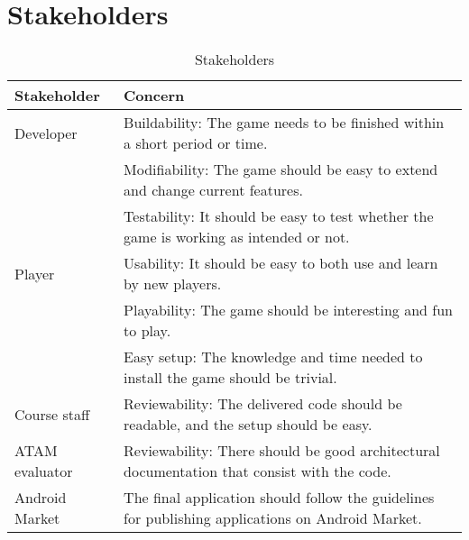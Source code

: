 \section{Stakeholders}

\begin{table}[h!]
\begin{tabular}{ | p{90pt} | p{270pt}  |}
\hline
\bf Stakeholder &  \bf Concern  \\ \hline
Developer & Buildability: The game needs to be finished within a short period or time. \\
&  Modifiability: The game should be easy to extend and change current features. \\
& Testability: It should be easy to test whether the game is working as intended or not.\\ \hline 
Player & Usability: It should be easy to both use and learn by new players. \\
& Playability: The game should be interesting and fun to play. \\
& Easy setup: The knowledge and time needed to install the game should be trivial. \\ \hline
Course staff & Reviewability: The delivered code should be readable, and the setup should be easy. \\ \hline
ATAM evaluator & Reviewability: There should be good architectural documentation that consist with the code.  \\ \hline
Android Market & The final application should follow the guidelines for publishing applications on Android Market. \\ \hline
\end{tabular}

\caption{Stakeholders}

\end{table}




